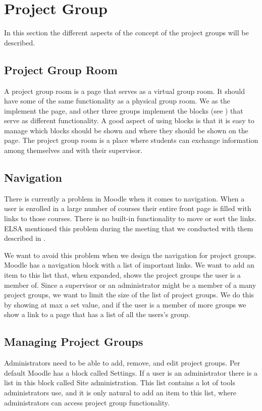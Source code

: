 \section{Project Group}
\label{sec:projectgroup}
In this section the different aspects of the concept of the project groups will be described.
\subsection{Project Group Room}
A project group room is a page that serves as a virtual group room. 
It should have some of the same functionality as a physical group room.
We as the \groupname{} implement the page, and other three groups implement the blocks (see ) that serve as different functionality.
A good aspect of using blocks is that it is easy to manage which blocks should be shown and where they should be shown on the page.
The project group room is a place where students can exchange information among themselves and with their supervisor.


\subsection{Navigation}
There is currently a problem in Moodle when it comes to navigation. 
When a user is enrolled in a large number of courses their entire front page is filled with links to those courses.
There is no built-in functionality to move or sort the links.
ELSA mentioned this problem during the meeting that we conducted with them described in .

We want to avoid this problem when we design the navigation for project groups.
Moodle has a navigation block with a list of important links.
We want to add an item to this list that, when expanded, shows the project groups the user is a member of.
Since a supervisor or an administrator might be a member of a many project groups, we want to limit the size of the list of project groups.
We do this by showing at max a set value, and if the user is a member of more groups we show a link to a page that has a list of all the users's group.

\subsection{Managing Project Groups}
\label{sec:s}
Administrators need to be able to add, remove, and edit project groups.
Per default Moodle has a block called Settings. 
If a user is an administrator there is a list in this block called Site administration. 
This list contains a lot of tools administrators use, and it is only natural to add an item to this list, where administrators can access project group functionality.

